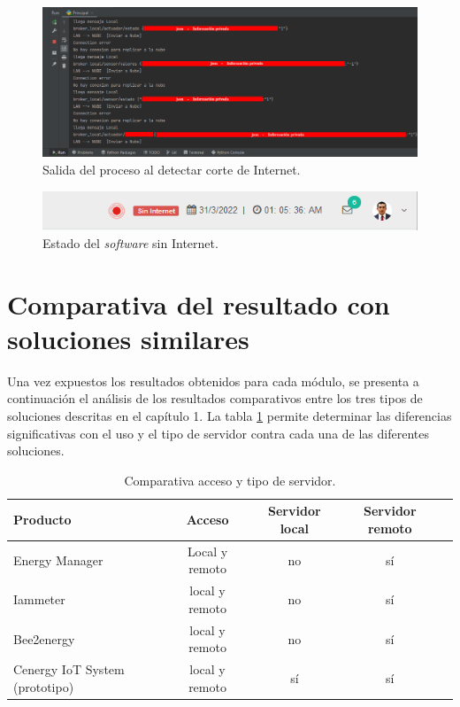 \begin{figure}[htpb]
\centering 
\includegraphics[width=1.0\textwidth]{./Figures/test/replicador/desconexion3.png}
\caption{Salida del proceso al detectar corte de Internet.}
\label{fig:inter1}
\end{figure}
\vspace{0.25cm}
\begin{figure}[htpb]
\centering 
\includegraphics[width=1.0\textwidth]{./Figures/test/replicador/desconexion2.png}
\caption{Estado del \emph{software} sin Internet.}
\label{fig:inter3}
\end{figure}


\section{Comparativa del resultado con soluciones similares}

Una vez expuestos los resultados obtenidos para cada módulo, se presenta a continuación el análisis de los resultados comparativos entre los tres tipos de soluciones descritas en el capítulo 1. La tabla \ref{tab:tabla-resultado} permite determinar las diferencias significativas con el uso y el tipo de servidor contra cada una de las diferentes soluciones.

\begin{table}[h]
	\centering
	\caption[Comparativa de soluciones entre acceso y servidor]{Comparativa acceso y tipo de servidor.}
	\begin{tabular}{p{4cm} c c c c }    
		\toprule
		\textbf{Producto} & \textbf{Acceso} & \textbf{Servidor local}   & \textbf{Servidor remoto} \\
		\midrule
		Energy Manager & Local y remoto  & no & sí  \\		
		Iammeter	 & local y remoto & no & sí  \\
		Bee2energy	 & local y remoto	& no & sí  \\
		Cenergy IoT System (prototipo) & local y remoto & sí & sí \\
		\bottomrule
		\hline
	\end{tabular}
	\label{tab:tabla-resultado}
\end{table}

